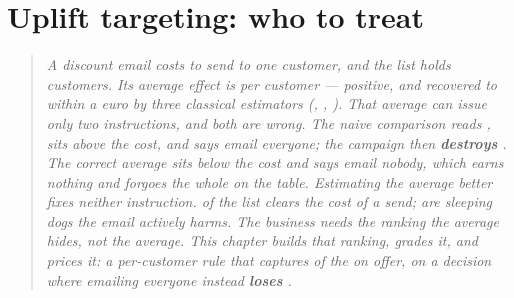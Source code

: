 %
%
\chapter{Uplift targeting: who to treat}
\label{ch:up}

\begin{quote}\small
\emph{A discount email costs \eur{\nbOneCost} to send to one customer, and the list holds
\nbOneNCustomers{} customers. Its average effect is \eur{\nbOneTrueAte} per customer --- positive, and
recovered to within a euro by three classical estimators (\eur{\nbOneOlsEst}, \eur{\nbOneLinEst},
\eur{\nbOneAipwEst}). That average can issue only two instructions, and both are wrong. The naive
comparison reads \eur{\nbOneNaiveEst}, sits above the cost, and says \emph{email everyone}; the campaign
then \textbf{destroys \eur{\nbOneTreatAllLoss}}. The correct average sits below the cost and says
\emph{email nobody}, which earns nothing and forgoes the whole \eur{\nbOneOracleProfit} on the table.
Estimating the average better fixes neither instruction. \pc{\nbOneShareProfitable} of the list clears
the cost of a send; \pc{\nbOneShareSleeping} are \emph{sleeping dogs} the email actively harms. The
business needs the \emph{ranking} the average hides, not the average. This chapter builds that ranking,
grades it, and prices it: a per-customer rule that captures \pc{\nbOneCapture} of the
\eur{\nbOneOracleProfit} on offer, on a decision where emailing everyone instead \textbf{loses
\eur{\nbOneTreatAllLoss}}.}
\end{quote}

